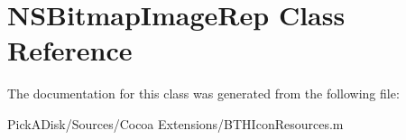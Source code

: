 \hypertarget{class_n_s_bitmap_image_rep}{
\section{NSBitmapImageRep Class Reference}
\label{class_n_s_bitmap_image_rep}
}


The documentation for this class was generated from the following file:\begin{DoxyCompactItemize}
\item 
PickADisk/Sources/Cocoa Extensions/BTHIconResources.m\end{DoxyCompactItemize}
